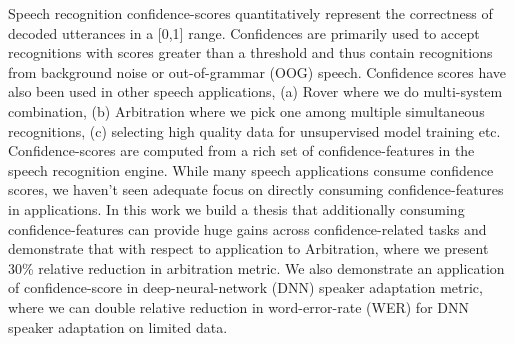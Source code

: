 Speech recognition confidence-scores quantitatively represent the correctness of
decoded utterances in a [0,1] range. Confidences are primarily used to accept recognitions
with scores greater than a threshold and thus contain recognitions from background noise
or out-of-grammar (OOG) speech. Confidence scores have also been used in other speech applications, 
(a) Rover where we do multi-system combination, (b) Arbitration where we pick one among multiple 
simultaneous recognitions, (c) selecting high quality data for unsupervised model training etc. 
Confidence-scores are computed from a rich set of confidence-features in the speech recognition engine. 
While many speech applications consume confidence scores, we haven't seen adequate focus on directly 
consuming confidence-features in applications. In this work we build a thesis that additionally consuming confidence-features can provide huge gains across confidence-related tasks and demonstrate that with respect to application to Arbitration, where we present 30\% relative reduction in arbitration metric. We also demonstrate an application of confidence-score in deep-neural-network (DNN) speaker adaptation metric, where we can double relative reduction in word-error-rate (WER) for DNN speaker adaptation on limited data.


%










